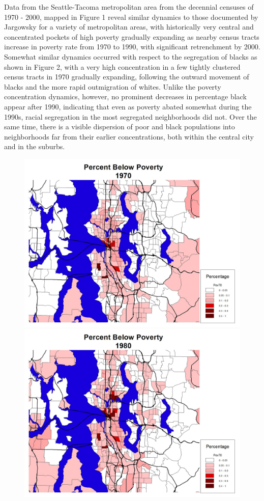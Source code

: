 \documentclass[12pt,a4paper]{article}
\begin{document}
Data from the Seattle-Tacoma metropolitan area from the decennial
censuses of 1970 - 2000, mapped in Figure 1 reveal similar dynamics
to those documented by Jargowsky \cite{jargowsky-asr-1996} for a
variety of metropolitan areas, with historically very central and
concentrated pockets of high poverty gradually expanding as nearby
census tracts increase in poverty rate from 1970 to 1990, with
significant retrenchment by 2000. Somewhat similar dynamics occurred
with respect to the segregation of blacks as shown in Figure 2, with
a very high concentration in a few tightly clustered census tracts
in 1970 gradually expanding, following the outward movement of
blacks and the more rapid outmigration of whites. Unlike the poverty
concentration dynamics, however, no prominent decreases in
percentage black appear after 1990, indicating that even as poverty
abated somewhat during the 1990s, racial segregation in the most
segregated neighborhoods did not. Over the same time, there is a
visible dispersion of poor and black populations into neighborhoods
far from their earlier concentrations, both within the central city
and in the suburbs.

\begin{figure}[h]
\centerline{
 \includegraphics[width=.45\textwidth,height=0.35\textwidth]
 {pctpoor1970.jpg} \hspace{1cm}
 \includegraphics[width=.45\textwidth,height=0.35\textwidth]
 {pctpoor1980.jpg}}
\end{figure}
\end{document}
